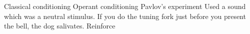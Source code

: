 \markdownRendererUlEndTight \markdownRendererUlItemEnd 
\markdownRendererUlEnd \markdownRendererInterblockSeparator
{}\markdownRendererInterblockSeparator
{}\markdownRendererUlBeginTight
\markdownRendererUlItem Classical conditioning\markdownRendererUlItemEnd 
\markdownRendererUlItem Operant conditioning\markdownRendererUlItemEnd 
\markdownRendererUlItem Pavlov's experiment\markdownRendererInterblockSeparator
{}\markdownRendererUlBeginTight
\markdownRendererUlItem Used a sound which was a neutral stimulus. If you do the tuning fork just before you present the bell, the dog salivates.\markdownRendererUlItemEnd 
\markdownRendererUlEndTight \markdownRendererUlItemEnd 
\markdownRendererUlItem Reinforce\markdownRendererUlItemEnd 
\markdownRendererUlEndTight \relax